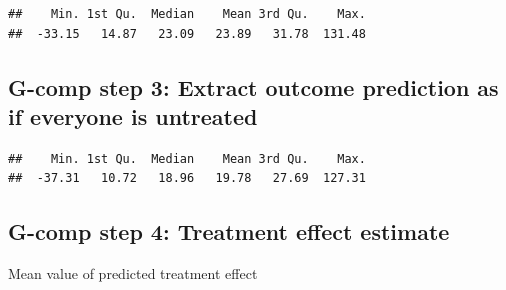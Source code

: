 \documentclass[
]{book}
\newenvironment{Shaded}{\begin{snugshade}}{\end{snugshade}}
\newcommand{\AttributeTok}[1]{\textcolor[rgb]{0.77,0.63,0.00}{#1}}
\newcommand{\DecValTok}[1]{\textcolor[rgb]{0.00,0.00,0.81}{#1}}
\newcommand{\FunctionTok}[1]{\textcolor[rgb]{0.00,0.00,0.00}{#1}}
\newcommand{\NormalTok}[1]{#1}
\newcommand{\OtherTok}[1]{\textcolor[rgb]{0.56,0.35,0.01}{#1}}
\newcommand{\SpecialCharTok}[1]{\textcolor[rgb]{0.00,0.00,0.00}{#1}}
\newcommand{\StringTok}[1]{\textcolor[rgb]{0.31,0.60,0.02}{#1}}
\begin{document}
\begin{verbatim}
##    Min. 1st Qu.  Median    Mean 3rd Qu.    Max. 
##  -33.15   14.87   23.09   23.89   31.78  131.48
\end{verbatim}

\hypertarget{g-comp-step-3-extract-outcome-prediction-as-if-everyone-is-untreated}{%
\subsection{G-comp step 3: Extract outcome prediction as if everyone is untreated}\label{g-comp-step-3-extract-outcome-prediction-as-if-everyone-is-untreated}}

\begin{Shaded}
\end{Shaded}

\begin{verbatim}
##    Min. 1st Qu.  Median    Mean 3rd Qu.    Max. 
##  -37.31   10.72   18.96   19.78   27.69  127.31
\end{verbatim}

\hypertarget{g-comp-step-4-treatment-effect-estimate}{%
\subsection{G-comp step 4: Treatment effect estimate}\label{g-comp-step-4-treatment-effect-estimate}}

\begin{Shaded}
\end{Shaded}

Mean value of predicted treatment effect
\end{document}

